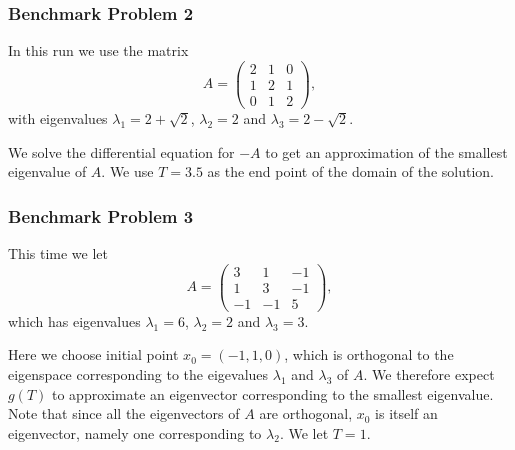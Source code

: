 \subsubsection{Benchmark Problem 2}\label{sec:benchmark problem 2}
In this run we use the matrix
\begin{equation}\label{eq:33mat2}
    A = \left(\begin{array}{ccc}
        2 & 1 & 0 \\
        1 & 2 & 1 \\
        0 & 1 & 2
    \end{array}\right),
\end{equation}
with eigenvalues $\lambda_1 = 2+\sqrt{2}$, $\lambda_2 = 2$ and $\lambda_3 = 2-\sqrt{2}$.

We solve the differential equation for $-A$ to get an approximation of the smallest eigenvalue of $A$. We use $T=3.5$ as the end point of the domain of the solution.

\subsubsection{Benchmark Problem 3}\label{sec:benchmark problem 3}
This time we let
\begin{equation}\label{eq:33mat3}
    A = \left(\begin{array}{ccc}
        3 & 1 & -1 \\
        1 & 3 & -1 \\
        -1 & -1 & 5
    \end{array}\right),
\end{equation}
which has eigenvalues $\lambda_1 = 6$, $\lambda_2 = 2$ and $\lambda_3 = 3$.

Here we choose initial point $x_0=(-1, 1, 0)$, which is orthogonal to the eigenspace corresponding to the eigevalues $\lambda_1$ and $\lambda_3$ of $A$. We therefore expect $g(T)$ to approximate an eigenvector corresponding to the smallest eigenvalue. Note that since all the eigenvectors of $A$ are orthogonal, $x_0$ is itself an eigenvector, namely one corresponding to $\lambda_2$. We let $T=1$.

